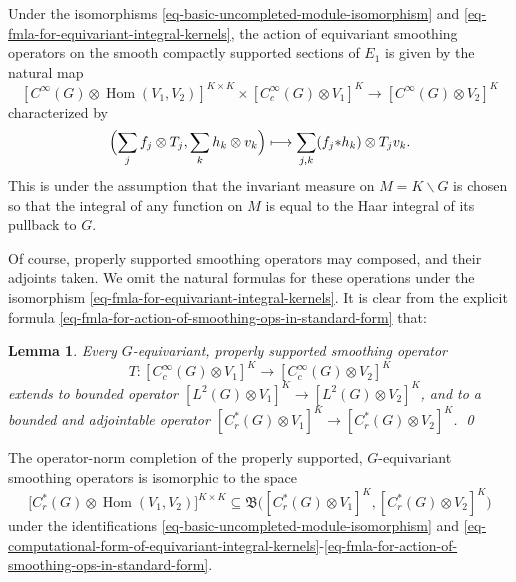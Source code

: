 \documentclass[leqno,11pt]{amsart}
\numberwithin{equation}{subsection}
\theoremstyle{plain}
\newtheorem{lemma}[equation]{Lemma}
\theoremstyle{definition}
\theoremstyle{remark}
\DeclareMathOperator{\Hom}{Hom}
\begin{document}
Under the isomorphisms \eqref{eq-basic-uncompleted-module-isomorphism} and \eqref{eq-fmla-for-equivariant-integral-kernels}, the action of equivariant smoothing operators on the smooth compactly supported sections of $E_1$ is given by the natural map 
\begin{equation}
\label{eq-action-of-smoothing-ops-in-standard-form}
 [  C^\infty (G)\otimes \Hom (V_1,V_2) ]^{K\times K}  \times 
 [ C^\infty_c (G) \otimes V_1]^{K }
 \longrightarrow 
 [   C^\infty (G)\otimes V_2 ]^{K }
\end{equation}
characterized by 
\begin{equation}
\label{eq-fmla-for-action-of-smoothing-ops-in-standard-form}
\Bigl ( \sum_j   f_j \otimes T_j  ,
\sum _k  h_k\otimes v_k\Bigr ) \longmapsto 
\sum_{j,k}   (f_j {*} h_k) \otimes T_j v_k .
\end{equation}
This is under the assumption that the invariant measure on $M = K \backslash G$ is chosen so that the integral of any function on $M$ is equal to the Haar integral of its pullback to $G$. 

Of course, properly supported smoothing operators may composed, and their adjoints taken.  We omit the natural formulas for these operations under  the isomorphism \eqref{eq-fmla-for-equivariant-integral-kernels}.  It is clear from the explicit formula \eqref{eq-fmla-for-action-of-smoothing-ops-in-standard-form} that:

\begin{lemma} 
Every $G$-equivariant, properly supported smoothing operator 
\[
T \colon  [ C_c^\infty  (G)\otimes V_1]^K \longrightarrow   [ C_c^\infty  (G)\otimes V_2]^K 
\]
extends to bounded   operator   
$ [ L^2 (G)\otimes V_1]^K \to  [L^2  (G)\otimes V_2]^K$,
and to a bounded and adjointable operator 
 $[C_r^*  (G)\otimes V_1]^K\to [ C_r^*  (G)\otimes V_2]^K$.  \qed
\end{lemma}
 
The operator-norm completion of the  properly supported, $G$-equivariant smoothing operators is isomorphic to the space 
\begin{equation}
\label{eq-norm-completion-f-smoothing-ops}
\bigl [ C^*_r (G)\otimes  \Hom (V_1,V_2)\bigr ]^{K\times K}
\subseteq \mathfrak{B} \bigl (  [  C^*_r(G)\otimes V_1 ]^K, [  C^*_r(G) \otimes V_2 ]^K\bigr )
\end{equation}
under the identifications  \eqref{eq-basic-uncompleted-module-isomorphism} and 
\eqref{eq-computational-form-of-equivariant-integral-kernels}-\eqref{eq-fmla-for-action-of-smoothing-ops-in-standard-form}.
\end{document}
